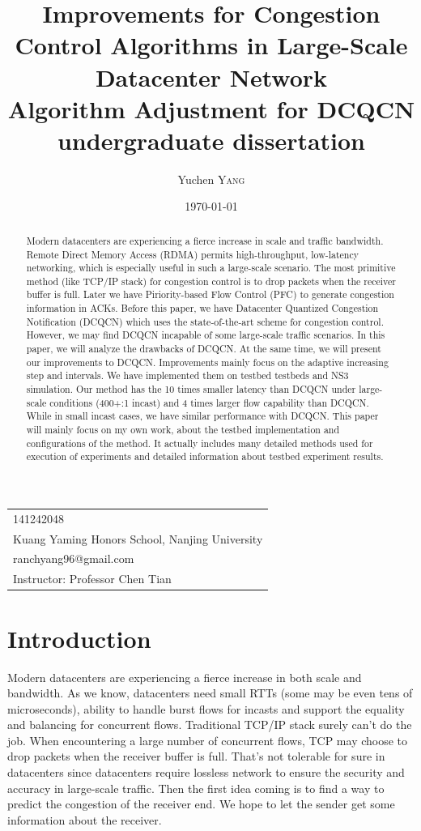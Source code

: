\documentclass[12pt,a4paper]{article}
\title{Improvements for Congestion Control Algorithms in Large-Scale Datacenter Network \\ Algorithm Adjustment for DCQCN \\ undergraduate dissertation} %
\author{Yuchen \textsc{Yang}} %
\date{\today} %
\begin{document}
\maketitle %

\begin{center}
\begin{tabular}{l}
141242048 \\
Kuang Yaming Honors School, Nanjing University \\
ranchyang96@gmail.com \\
Instructor: Professor Chen Tian
\end{tabular}
\end{center}


\begin{abstract}
	Modern datacenters are experiencing a fierce increase in scale and traffic bandwidth.
	Remote Direct Memory Access (RDMA) permits high-throughput, low-latency networking,
	which is especially useful in such a large-scale scenario.
	The most primitive method (like TCP/IP stack) for congestion control is to drop packets when the receiver buffer is full.
	Later we have Piriority-based Flow Control (PFC) to generate congestion information in ACKs.
	Before this paper, we have Datacenter Quantized Congestion Notification (DCQCN) which uses the state-of-the-art scheme for congestion control.
	However, we may find DCQCN incapable of some large-scale traffic scenarios.
	In this paper, we will analyze the drawbacks of DCQCN.
	At the same time, we will present our improvements to DCQCN.
	Improvements mainly focus on the adaptive increasing step and intervals.
	We have implemented them on testbed testbeds and NS3 simulation.
	Our method has the 10 times smaller latency than DCQCN under large-scale conditions (400+:1 incast) and 4 times larger flow capability than DCQCN.
	While in small incast cases, we have similar performance with DCQCN.
	This paper will mainly focus on my own work, about the testbed implementation and configurations of the method.
	It actually includes many detailed methods used for execution of experiments and detailed information about testbed experiment results.
\end{abstract}


\section{Introduction}

Modern datacenters are experiencing a fierce increase in both scale and bandwidth.
As we know, datacenters need small RTTs (some may be even tens of microseconds),
ability to handle burst flows for incasts and support the equality and balancing for concurrent flows.
Traditional TCP/IP stack surely can't do the job.
When encountering a large number of concurrent flows, TCP may choose to drop packets when the receiver buffer is full.
That's not tolerable for sure in datacenters since datacenters require lossless network to ensure the security and accuracy in large-scale traffic.
Then the first idea coming is to find a way to predict the congestion of the receiver end.
We hope to let the sender get some information about the receiver.
\end{document}
